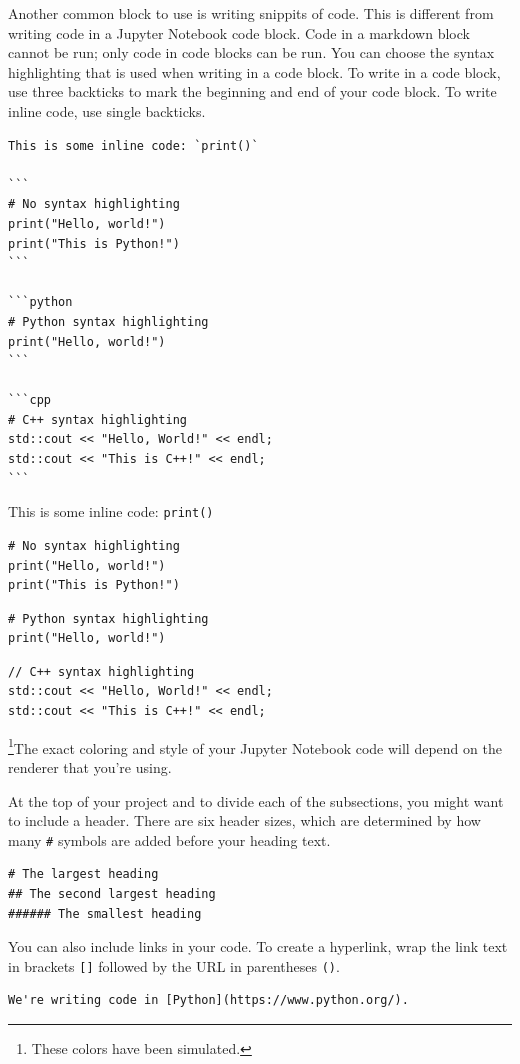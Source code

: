 Another common block to use is writing snippits of code. This is different from writing code in a Jupyter Notebook code block. Code in a markdown block cannot be run; only code in code blocks can be run. You can choose the syntax highlighting that is used when writing in a code block. To write in a code block, use three backticks to mark the beginning and end of your code block. To write inline code, use single backticks.\par
{}
\begin{lstlisting}
This is some inline code: `print()`

```
# No syntax highlighting
print("Hello, world!")
print("This is Python!")
```

```python
# Python syntax highlighting
print("Hello, world!")
```

```cpp
# C++ syntax highlighting
std::cout << "Hello, World!" << endl;
std::cout << "This is C++!" << endl;
```
\end{lstlisting}
This is some inline code: \verb|print()|\par
\begin{lstlisting}
# No syntax highlighting
print("Hello, world!")
print("This is Python!")
\end{lstlisting}
\begin{lstlisting}[style=pippython]
# Python syntax highlighting
print("Hello, world!")
\end{lstlisting}

\begin{lstlisting}[style=cpp]
// C++ syntax highlighting
std::cout << "Hello, World!" << endl;
std::cout << "This is C++!" << endl;
\end{lstlisting}
\footnote{These colors have been simulated.}The exact coloring and style of your Jupyter Notebook code will depend on the renderer that you're using.\par
At the top of your project and to divide each of the subsections, you might want to include a header. There are six header sizes, which are determined by how many \verb|#| symbols are added before your heading text.
\begin{lstlisting}
# The largest heading
## The second largest heading
###### The smallest heading
\end{lstlisting}
You can also include links in your code. To create a hyperlink, wrap the link text in brackets \verb|[]| followed by the URL in parentheses \verb|()|.\par
\begin{lstlisting}[style=none]
We're writing code in [Python](https://www.python.org/).
\end{lstlisting}

